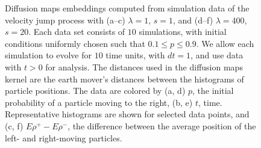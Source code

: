 \documentclass[preprint]{elsarticle}
\begin{document}
\begin{figure}[t!]
\begin{subfigure}{\figwidth}
\caption{}
\label{subfig:large_lambda_rho}
\end{subfigure}
\caption{Diffusion maps embeddings computed from simulation data of the velocity jump process with (a--c) $\lambda=1$, $s=1$, and (d--f) $\lambda=400$, $s=20$.  Each data set consists of $10$ simulations, with initial conditions uniformly chosen such that $0.1 \le p  \le 0.9$. We allow each simulation to evolve for $10$ time units, with $dt=1$, and use data with $t > 0$ for analysis. The distances used in the diffusion maps kernel are the earth mover's distances between the histograms of particle positions. The data are colored by (a, d) $p$, the initial probability of a particle moving to the right, (b, e) $t$, time. Representative histograms are shown for selected data points, and (c, f) $E \rho^+ - E \rho^-$, the difference between the average position of the left- and right-moving particles.}
\label{fig:dmaps_embed_emd}
\end{figure}
\end{document}
